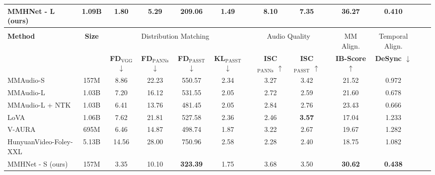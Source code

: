\begin{table}[t!]
{\begin{tabular}{lccccccccccccc}
 \rowcolor{aliceblue} MMHNet - L (ours) & 1.09B & \textbf{1.80} & \textbf{5.29} & \textbf{209.06} & 1.49 & &\textbf{8.10} & {7.35} &&  \textbf{36.27} & \textbf{0.410} \\
\toprule
\rowcolor{Lightgray} \multicolumn{12}{c}{\textbf{LongVale}} \\
\hline
\multirow{2}{*}{\textbf{Method}}& \multirow{2}{*}{\textbf{Size}} & \multicolumn{4}{c}{Distribution Matching} & & \multicolumn{2}{c}{Audio Quality} & & MM Align. & Temporal Align. \\
\cline{3-6} \cline{8-9} \cline{11-12}
  &  & \textbf{FD$_\textrm{VGG}$ $\downarrow$} & \textbf{FD$_\textrm{PANNs}$ $\downarrow$} & \textbf{FD$_\textrm{PASST}$ $\downarrow$} & \textbf{KL$_\textrm{PASST}$ $\downarrow$} & &\textbf{ISC$_\textrm{PANNs}$ $\uparrow$} & \textbf{ISC$_\textrm{PASST}$ $\uparrow$} & & \textbf{IB-Score $\uparrow$} & \textbf{DeSync $\downarrow$} \\
\toprule
MMAudio-S~\cite{cheng2025mmaudio} & 157M & 8.86 & 22.23 & 550.57 & 2.34 && 3.27 & 3.42 && 21.52  & 0.972  \\
MMAudio-L~\cite{cheng2025mmaudio} & 1.03B & 7.20 & 16.12 & 531.55 & 2.05 && 2.72 & 2.59 && 21.60  & 0.678  \\
MMAudio-L + NTK~\cite{cheng2025mmaudio} &1.03B  & 6.41 &  13.76 & 481.45 & 2.05   && 2.84  & 2.76  && 23.43  & 0.666 \\
LoVA~\cite{cheng2025lova} & 1.06B & 7.62  &21.81 & 527.58 & 2.36  && 2.46 & \textbf{3.57}  && 17.04 & 1.233   \\
V-AURA~\cite{viertola2025vaura} & 695M &6.46  &14.87   &498.74   &1.87 &&3.22 & 2.67  && 19.67 &1.282 \\
HunyuanVideo-Foley-XXL~\cite{shan2025hunyuanvideofoley} & 5.13B   &14.56   & 28.00     &750.96    & 2.58 &&2.28  &2.40&    &18.75    &1.082 \\
 \rowcolor{aliceblue} MMHNet - S (ours) & 157M & 3.35 & 10.10 & \textbf{323.39}
 & {1.75} & & 3.68 & {3.50} &&\textbf{30.62}  & \textbf{0.438}   \\

\end{tabular}}
\end{table}
